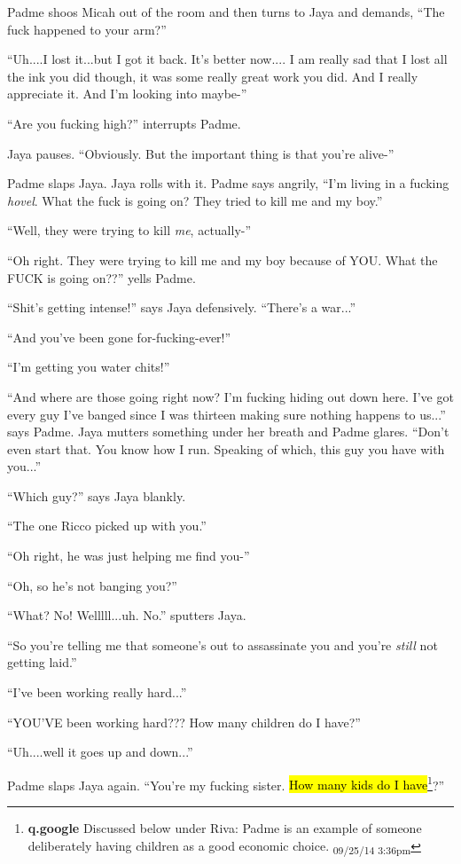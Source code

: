 Padme shoos Micah out of the room and then turns to Jaya and demands, ``The fuck happened to your arm?''

``Uh....I lost it...but I got it back.  It's better now.... I am really sad that I lost all the ink you did though, it was some really great work you did.  And I really appreciate it.  And I'm looking into maybe-''

``Are you fucking high?'' interrupts Padme.

Jaya pauses.  ``Obviously.  But the important thing is that you're alive-''

Padme slaps Jaya.  Jaya rolls with it.   Padme says angrily, ``I'm living in a fucking \textit{hovel}.  What the fuck is going on?  They tried to kill me and my boy.''

``Well, they were trying to kill \textit{me}, actually-''

``Oh right.  They were trying to kill me and my boy because of YOU.  What the FUCK is going on??'' yells Padme.

``Shit's getting intense!'' says Jaya defensively.  ``There's a war...''

``And you've been gone for-fucking-ever!''

``I'm getting you water chits!''

``And where are those going right now?  I'm fucking hiding out down here.  I've got every guy I've banged since I was thirteen making sure nothing happens to us...'' says Padme.  Jaya mutters something under her breath and Padme glares. ``Don't even start that.  You know how I run.  Speaking of which, this guy you have with you...''

``Which guy?'' says Jaya blankly.

``The one Ricco picked up with you.''

``Oh right, he was just helping me find you-''

``Oh, so he's not banging you?''

``What?  No!  Welllll...uh.  No.'' sputters Jaya.

``So you're telling me that someone's out to assassinate you and you're \textit{still} not getting laid.''

``I've been working really hard...''

``YOU'VE been working hard???  How many children do I have?''

``Uh....well it goes up and down...''

Padme slaps Jaya again.  ``You're my fucking sister.  \hl{How many kids do I have}\footnote{\textbf{q.google }Discussed below under Riva: Padme is an example of someone deliberately having children as a good economic choice. \textsubscript{09/25/14 3:36pm}}?''

